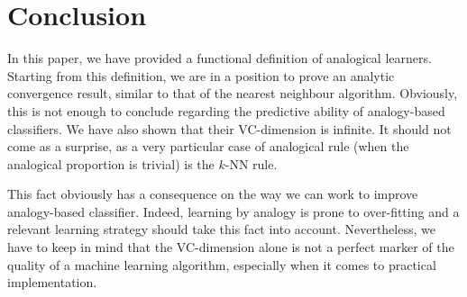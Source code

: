 {\section{Conclusion}\label{conc}

In this paper, we have provided a  functional definition of analogical
learners.  Starting from this definition, we are in a position to prove an
analytic convergence result, similar to that of the nearest neighbour
algorithm. Obviously, this is not enough to conclude regarding the predictive
ability of analogy-based classifiers. We have also shown that their
VC\mbox{-}dimension is infinite.  It should not come as a surprise, as a very
particular case of analogical rule (when the analogical proportion is trivial)
is the $k$-NN rule.

This fact obviously has a consequence on the way we can
work to improve analogy-based classifier.  Indeed, learning by analogy is prone
to over-fitting and a relevant learning strategy should take this fact into
account.  Nevertheless, we have to keep in mind that the VC\mbox{-}dimension
alone is not a perfect marker of the quality of a machine learning algorithm,
especially when it comes
to practical implementation.

}
